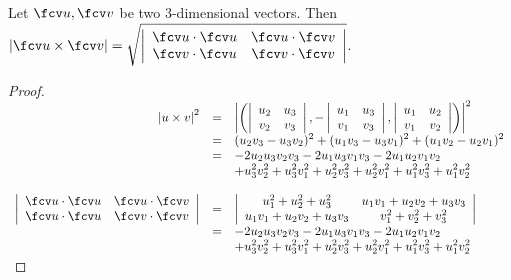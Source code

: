 \begin{frame}
\vskip -0.1cm
\begin{theorem}
Let $\fcv u, \fcv v$ be two 3-dimensional vectors. Then 
$\displaystyle
|\fcv u \times \fcv v | = \sqrt{\left|\begin{array}{cc}\fcv u \cdot \fcv u & \fcv u \cdot \fcv v \\ \fcv v \cdot \fcv u & \fcv v \cdot \fcv v \end{array} \right| }
$.
\end{theorem}

\vskip -0.1cm

\begin{proof}
$\begin{array}{rcl}
\displaystyle \left| u\times v \right|^2&=&\displaystyle  \left|\left(\left|  \begin{array}{cc} u_2 &u_3\\ v_2 &v_3 \end{array} \right|, -\left|  \begin{array}{cc} u_1 &u_3\\ v_1 &v_3 \end{array} \right|, \left|  \begin{array}{cc} u_1 &u_2\\ v_1 &v_2 \end{array} \right|\right)\right|^2\\
&=&\displaystyle (u_2v_3-u_3v_2)^2+ (u_1v_3 - u_3v_1)^2+(u_1v_2-u_2v_1)^2\\
&=&\displaystyle   -2 {u}_{2}{u}_{3}{v}_{2} {v}_{3}-2{u}_{1}{u}_{3}{v}_{1} {v}_{3}-2 {u}_{1} {u}_{2}    {v}_{1}  {v}_{2}   \\
&&\displaystyle + {u}_{3} ^{2}  {v}_{2} ^{2}+ {u}_{3} ^{2}  {v}_{1} ^{2}+ {u}_{2} ^{2}  {v}_{3} ^{2}+ {u}_{2} ^{2}  {v}_{1} ^{2}+ {u}_{1} ^{2}  {v}_{3} ^{2}+ {u}_{1} ^{2}  {v}_{2} ^{2} \\~\\
\displaystyle \left|\begin{array}{cc}\fcv u \cdot \fcv u & \fcv u \cdot \fcv v \\ \fcv u \cdot \fcv u & \fcv v \cdot \fcv v \end{array} \right|&=&\displaystyle \left|\begin{array}{cc}u_1^2+u_2^2+u_3^2 & u_1v_1+u_2v_2+u_3v_3 \\ u_1v_1+u_2v_2+u_3v_3 &v_1^2+v_2^2+v_3^2 \end{array} \right|\\
&=&\displaystyle   -2 {u}_{2}{u}_{3}{v}_{2} {v}_{3}-2{u}_{1}{u}_{3}{v}_{1} {v}_{3}-2 {u}_{1} {u}_{2}    {v}_{1}  {v}_{2}   \\
&&\displaystyle + {u}_{3} ^{2}  {v}_{2} ^{2}+ {u}_{3} ^{2}  {v}_{1} ^{2}+ {u}_{2} ^{2}  {v}_{3} ^{2}+ {u}_{2} ^{2}  {v}_{1} ^{2}+ {u}_{1} ^{2}  {v}_{3} ^{2}+ {u}_{1} ^{2}  {v}_{2} ^{2} \\
\end{array}
$
\end{proof}

\end{frame}